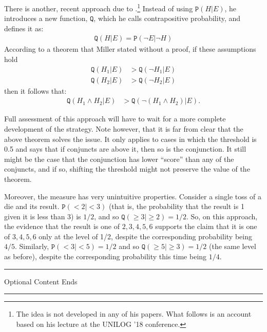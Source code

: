 \documentclass{ifcolog}
\newcommand{\intermezzob}{\nopagebreak 
	\begin{minipage}[c]{13cm}
	\begin{center}\rule{10cm}{0.4pt}

	\tiny{\sc Optional Content Ends}
	
	\vspace{-1mm}
	
	\rule{10cm}{0.4pt}\end{center}
	\end{minipage}
	}
\newcommand{\pr}[1]{\mbox{$\mathtt{P}(#1)$}}
\newcommand{\n}{\neg}
\newcommand{\et}{\wedge}
\begin{document}
There is another, recent approach  due to \citet{Miller2018}.\footnote{The idea is not developed in any of his papers. What follows is an account based on his lecture at the UNILOG '18 conference.} Instead of  using  $\pr{H \vert E}$, he introduces a new function, $\mathtt{Q}$, which he calls contrapositive probability,  and defines it as:
\begin{align*}
\mathtt{Q}(H\vert E) = \pr{\n E\vert \n H}
\end{align*}
According to a theorem that Miller stated without a proof, if these assumptions hold
\begin{align*}
\mathtt{Q}(H_1\vert E) & > \mathtt{Q}(\n H_1 \vert E)\\
\mathtt{Q}(H_2\vert E) & > \mathtt{Q}(\n H_2 \vert E)
\end{align*}
then it follows that:
\begin{align*}
\mathtt{Q}(H_1\et H_2\vert E) &
 > \mathtt{Q}(\n (H_1 \et H_2) \vert E).
\end{align*}
\noindent

Full assessment of this approach will have to wait for a more complete development of the strategy. Note however, that it is far from  clear that the above theorem solves the issue. It only applies to cases in which the threshold is 0.5 and says that if conjuncts are above it, then so is the conjunction. It still might be the case that the conjunction has lower ``score'' than any of the conjuncts, and if so, shifting the threshold might not preserve the value of the theorem. 

Moreover, the measure has very unintuitive properties. Consider a single toss of a die and its result. $\pr{<2\vert <3}$ (that is, the probability that the result is 1 given it is less than 3) is $1/2$, and so $\mathtt{Q}(\geq 3\vert \geq 2)=1/2$. So, on this approach, the evidence that the result is one of $2,3,4,5,6$ supports the claim that it is one of $3,4,5,6$ only at the level of 1/2, despite the corresponding probability being $4/5$. Similarly, $\pr{<3\vert <5}=1/2$ and so $\mathtt{Q}(\geq 5\vert \geq 3)=1/2$ (the same level as before), despite the corresponding probability this time being $1/4$.



 \intermezzob
\end{document}
